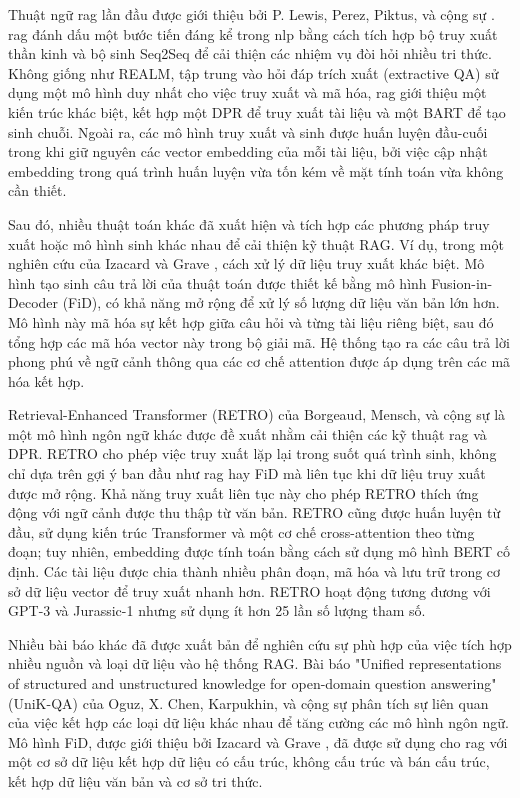 Thuật ngữ \gls{rag} lần đầu được giới thiệu bởi P. Lewis, Perez, Piktus, và cộng sự \cite{lewis2020retrieval}. \gls{rag} đánh dấu một bước tiến đáng kể trong \gls{nlp} bằng cách tích hợp bộ truy xuất thần kinh và bộ sinh Seq2Seq để cải thiện các nhiệm vụ đòi hỏi nhiều tri thức. Không giống như REALM, tập trung vào hỏi đáp trích xuất (extractive QA) sử dụng một mô hình duy nhất cho việc truy xuất và mã hóa, \gls{rag} giới thiệu một kiến trúc khác biệt, kết hợp một DPR để truy xuất tài liệu và một BART để tạo sinh chuỗi. Ngoài ra, các mô hình truy xuất và sinh được huấn luyện đầu-cuối trong khi giữ nguyên các vector embedding của mỗi tài liệu, bởi việc cập nhật embedding trong quá trình huấn luyện vừa tốn kém về mặt tính toán vừa không cần thiết.




Sau đó, nhiều thuật toán khác đã xuất hiện và tích hợp các phương pháp truy xuất hoặc mô hình sinh khác nhau để cải thiện kỹ thuật RAG. Ví dụ, trong một nghiên cứu của Izacard và Grave \cite{izacard2020leveraging}, cách xử lý dữ liệu truy xuất khác biệt. Mô hình tạo sinh câu trả lời của thuật toán được thiết kế bằng mô hình Fusion-in-Decoder (FiD), có khả năng mở rộng để xử lý số lượng dữ liệu văn bản lớn hơn. Mô hình này mã hóa sự kết hợp giữa câu hỏi và từng tài liệu riêng biệt, sau đó tổng hợp các mã hóa vector này trong bộ giải mã. Hệ thống tạo ra các câu trả lời phong phú về ngữ cảnh thông qua các cơ chế attention được áp dụng trên các mã hóa kết hợp.


Retrieval-Enhanced Transformer (RETRO) của Borgeaud, Mensch, và cộng sự \cite{borgeaud2022improving} là một mô hình ngôn ngữ khác được đề xuất nhằm cải thiện các kỹ thuật \gls{rag} và DPR. RETRO cho phép việc truy xuất lặp lại trong suốt quá trình sinh, không chỉ dựa trên gợi ý ban đầu như \gls{rag} hay FiD mà liên tục khi dữ liệu truy xuất được mở rộng. Khả năng truy xuất liên tục này cho phép RETRO thích ứng động với ngữ cảnh được thu thập từ văn bản. RETRO cũng được huấn luyện từ đầu, sử dụng kiến trúc Transformer và một cơ chế cross-attention theo từng đoạn; tuy nhiên, embedding được tính toán bằng cách sử dụng mô hình BERT cố định. Các tài liệu được chia thành nhiều phân đoạn, mã hóa và lưu trữ trong cơ sở dữ liệu vector để truy xuất nhanh hơn. RETRO hoạt động tương đương với GPT-3 và Jurassic-1 nhưng sử dụng ít hơn 25 lần số lượng tham số.


Nhiều bài báo khác đã được xuất bản để nghiên cứu sự phù hợp của việc tích hợp nhiều nguồn và loại dữ liệu vào hệ thống RAG. Bài báo "Unified representations of structured and unstructured knowledge for open-domain question answering" (UniK-QA) của Oguz, X. Chen, Karpukhin, và cộng sự \cite{oguz2020unikqa} phân tích sự liên quan của việc kết hợp các loại dữ liệu khác nhau để tăng cường các mô hình ngôn ngữ. Mô hình FiD, được giới thiệu bởi Izacard và Grave \cite{izacard2020leveraging}, đã được sử dụng cho \gls{rag} với một cơ sở dữ liệu kết hợp dữ liệu có cấu trúc, không cấu trúc và bán cấu trúc, kết hợp dữ liệu văn bản và cơ sở tri thức.


